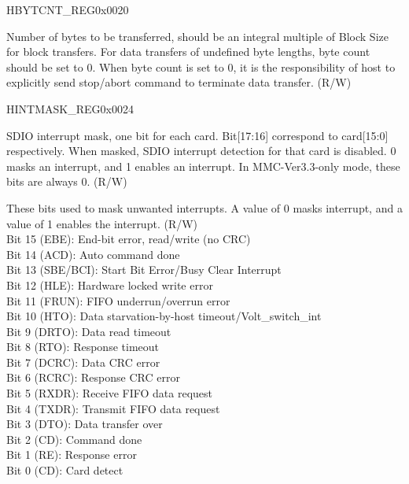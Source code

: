 \begin{register}{H}{BYTCNT\_REG}{0x0020}\label{regdesc:BYTCNTREG}
%
\regnewline%
\begin{regdesc}\begin{reglist}
\item [BYTCNT\_REG]Number of bytes to be transferred, should be an integral multiple of Block Size for block transfers. For data transfers of undefined byte lengths, byte count should be set to 0. When byte count is set to 0, it is the responsibility of host to explicitly send stop/abort command to terminate data transfer. (R/W)
\end{reglist}\end{regdesc}
\end{register}


\begin{register}{H}{INTMASK\_REG}{0x0024}\label{regdesc:INTMASKREG}
%
%
%
\regnewline%
\begin{regdesc}\begin{reglist}
\item [SDIO\_INT\_MASK]SDIO interrupt mask, one bit for each card. Bit[17:16] correspond to card[15:0] respectively. When masked, SDIO interrupt detection for that card is disabled. 0 masks an interrupt, and 1 enables an interrupt. In MMC-Ver3.3-only mode, these bits are always 0. (R/W)
\item [INT\_MASK]These bits used to mask unwanted interrupts. A value of 0 masks interrupt, and a value of 1 enables the interrupt. (R/W)\\
Bit 15 (EBE): End-bit error, read/write (no CRC)\\
Bit 14 (ACD): Auto command done\\
Bit 13 (SBE/BCI): Start Bit Error/Busy Clear Interrupt\\
Bit 12 (HLE): Hardware locked write error\\
Bit 11 (FRUN): FIFO underrun/overrun error\\
Bit 10 (HTO): Data starvation-by-host timeout/Volt\_switch\_int\\
Bit 9 (DRTO): Data read timeout\\
Bit 8 (RTO): Response timeout \\
Bit 7 (DCRC): Data CRC error \\
Bit 6 (RCRC): Response CRC error \\
Bit 5 (RXDR): Receive FIFO data request \\
Bit 4 (TXDR): Transmit FIFO data request \\
Bit 3 (DTO): Data transfer over \\
Bit 2 (CD): Command done \\
Bit 1 (RE): Response error\\
Bit 0 (CD): Card detect
\end{reglist}\end{regdesc}
\end{register}


